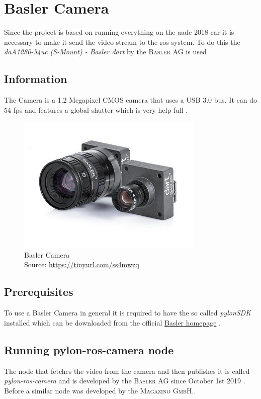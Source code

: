 
\chapter{Basler Camera\authorA}\label{ref:lsdslam}
Since the project is based on running everything on the \gls{aadc} 2018 car it is necessary to make it send the video stream to the \gls{ros} system. To do this the \textit{daA1280-54uc (S-Mount) - Basler dart} by the \textsc{Basler AG} is used

\section{Information}
The Camera is a 1.2 Megapixel CMOS camera that uses a USB 3.0 bus. It can do 54 \gls{fps} and features a global shutter which is very help full \cite{baslerCamera}.
\begin{figure}[h]
	\centering
	\includegraphics[height=0.3\textwidth]{./media/images/Basler-Camera.jpg}
  	\caption{Basler Camera
  	\\Source: \url{https://tinyurl.com/ss4mwzq}}
  	\label{orbslamkittidataset}
\end{figure}

\section{Prerequisites}
To use a Basler Camera in general it is required to have the so called \textit{pylonSDK} installed which can be downloaded from the official \href{https://www.baslerweb.com/de/vertrieb-support/downloads/downloads-software/}{Basler homepage} \cite{pylonsdkdownloadpage}.

\section{Running pylon-ros-camera node}
The node that fetches the video from the camera and then publishes it is called \textit{pylon-ros-camera} and is developed by the \textsc{Basler AG} since October 1st 2019 \cite{pylonroscamera}. Before a similar node was developed by the \textsc{Magazino GmbH}.\cite{pyloncamera}.


